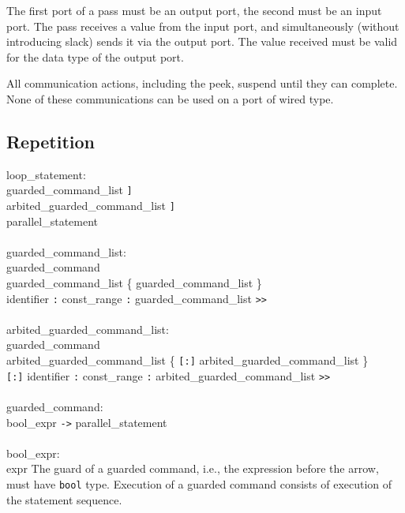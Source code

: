 The first port of a pass must be an output port, the second must be
an input port. The pass receives a value from the input port, and
simultaneously (without introducing slack) sends it via the output port.
The value received must be valid for the data type of the output port.

All communication actions, including the peek, suspend until they can
complete. None of these communications can be used on a port of wired type.


\subsection{Repetition}\label{sec:loop}

\grammarstart
loop\_statement: \\
       \>{\tt{}*[} guarded\_command\_list {\tt{}]} \\
\orbox \>{\tt{}*[} arbited\_guarded\_command\_list {\tt{}]} \\
\orbox \>{\tt{}*[} parallel\_statement\TSEQ {\tt{}]} \\
 \\
guarded\_command\_list: \\
       \>guarded\_command \\
\orbox \>guarded\_command\_list \{ {\tt{}\orbox} guarded\_command\_list \}\SERIESOPT  \\
\orbox \>{\tt{}<<} {\tt{}\orbox} identifier {\tt{}:} const\_range {\tt{}:} guarded\_command\_list {\tt{}>>} \\
 \\
arbited\_guarded\_command\_list: \\
       \>guarded\_command \\
\orbox \>arbited\_guarded\_command\_list \{ {\tt{}[:]} arbited\_guarded\_command\_list \}\SERIESOPT  \\
\orbox \>{\tt{}<<} {\tt{}[:]} identifier {\tt{}:} const\_range {\tt{}:} arbited\_guarded\_command\_list {\tt{}>>} \\
 \\
guarded\_command: \\
      \>bool\_expr {\tt{}->} parallel\_statement\TSEQ \\
 \\
bool\_expr: \\
      \>expr
\grammarend
The guard of a guarded command, i.e., the expression before the arrow,
must have {\tt{}bool} type. Execution of a guarded command consists of
execution of the statement sequence.


